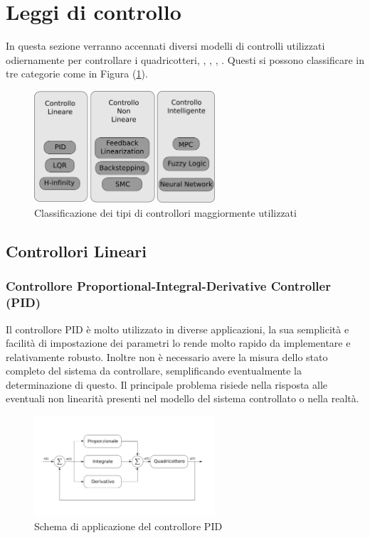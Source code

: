 \section{Leggi di controllo}
In questa sezione verranno accennati diversi modelli di controlli utilizzati odiernamente per controllare i quadricotteri, \cite{ZuluAndrew2014ARoC}, \cite{KimJinho2020ACSo}, \cite{PID_vs_LQ}, \cite{G_inf}. Questi si possono classificare in tre categorie come in Figura (\ref{fig:categoriecontrolli}).
\begin{figure}
	\centering
	\includegraphics[width=0.6\textwidth]{SistemaQuadrirotore/Figure/Classificazione}
	\caption{Classificazione dei tipi di controllori maggiormente utilizzati \cite{KimJinho2020ACSo}}
	\label{fig:categoriecontrolli}
\end{figure}



\subsection{Controllori Lineari}
\subsubsection{Controllore Proportional-Integral-Derivative Controller (PID)}
Il controllore PID è molto utilizzato in diverse applicazioni, la sua semplicità e facilità di impostazione dei parametri lo rende molto rapido da implementare e relativamente robusto. Inoltre non è necessario avere la misura dello stato completo del sistema da controllare, semplificando eventualmente la determinazione di questo. Il principale problema risiede nella risposta alle eventuali non linearità presenti nel modello del sistema controllato o nella realtà.


\begin{figure}
	\centering
	\includegraphics[width=0.6\textwidth]{SistemaQuadrirotore/Figure/PID}
	\caption{Schema di applicazione del controllore PID}
\end{figure}

